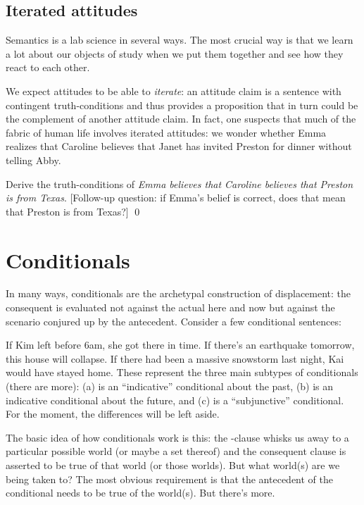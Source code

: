 \subsection{Iterated attitudes}
\label{subsec:iterated-attitudes}

%
Semantics is a lab science in several ways. The most crucial way is that we
learn a lot about our objects of study when we put them together and see how
they react to each other.

We expect attitudes to be able to \emph{iterate}: an attitude claim is a
sentence with contingent truth-conditions and thus provides a proposition that
in turn could be the complement of another attitude claim. In fact, one suspects
that much of the fabric of human life involves iterated attitudes: we wonder
whether Emma realizes that Caroline believes that Janet has invited Preston for
dinner without telling Abby.

\begin{exercise}
  Derive the truth-conditions of \emph{Emma believes that Caroline believes that
    Preston is from Texas}. [Follow-up question: if Emma's belief is correct,
  does that mean that Preston is from Texas?] \qed
\end{exercise}

\clearpage
\section{Conditionals}
\label{sec:conditionals}

In many ways, conditionals are the archetypal construction of displacement: the
consequent is evaluated not against the actual here and now but against the
scenario conjured up by the antecedent. Consider a few conditional sentences:

\pex
\a If Kim left before 6am, she got there in time.
\a If there's an earthquake tomorrow, this house will collapse.\label{ex:earthquake}
\a If there had been a massive snowstorm last night, Kai would have stayed home.
\xe
%
These represent the three main subtypes of conditionals (there are more):
(\lastx a) is an ``indicative'' conditional about the past, (\lastx b) is an
indicative conditional about the future, and (\lastx c) is a ``subjunctive''
conditional. For the moment, the differences will be left aside.

The basic idea of how conditionals work is this: the -clause
whisks us away to a particular possible world (or maybe a set thereof) and the
consequent clause is asserted to be true of that world (or those worlds). But
what world(s) are we being taken to? The most obvious requirement is that the
antecedent of the conditional needs to be true of the world(s). But there's
more.

